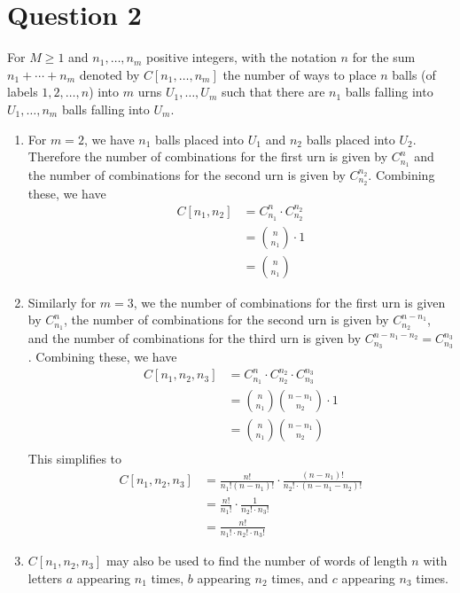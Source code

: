 \documentclass[11pt, oneside]{article}   	%
\begin{document}
\section*{Question 2}

For $M \geq 1$ and $n_1, \ldots , n_m$ positive integers, with the notation $n$ for the sum $n_1 + \cdots + n_m$ denoted by $C[n_1 , \ldots , n_m]$ the number of ways to place $n$ balls (of labels $1,2, \ldots , n$) into $m$ urns $U_1, \ldots , U_m$ such that there are $n_1$ balls falling into $U_1, \ldots , n_m$ balls falling into $U_m$.

\begin{enumerate}[\quad (a)]
	\item For $m=2$, we have $n_1$ balls placed into $U_1$ and $n_2$ balls placed into $U_2$. Therefore the number of combinations for the first urn is given by $C_{n_1}^n$ and the number of combinations for the second urn is given by $C_{n_2}^{n_2}$. Combining these, we have
	\begin{align*}
		C[n_1, n_2] & = C_{n_1}^n \cdot C_{n_2}^{n_2} \\
		& = {n \choose n_1} \cdot 1 \\
		& = {n \choose n_1}
	\end{align*}
	
	\item Similarly for $m=3$, we the number of combinations for the first urn is given by $C_{n_1}^n$, the number of combinations for the second urn is given by $C_{n_2}^{n-n_1}$, and the number of combinations for the third urn is given by $C_{n_3}^{n-n_1-n_2} = C_{n_3}^{n_3}$. Combining these, we have
	\begin{align*}
		C[n_1, n_2, n_3] & = C_{n_1}^n \cdot C_{n_2}^{n_2} \cdot C_{n_3}^{n_3} \\
		& =  {n \choose n_1} {n-n_1 \choose n_2} \cdot 1\\
		& = {n \choose n_1} {n-n_1 \choose n_2}\\
	\end{align*}
	This simplifies to
	\begin{align*}
		C[n_1, n_2, n_3] & = \frac{n!}{n_1! (n-n_1)!} \cdot \frac{(n-n_1)!}{n_2! \cdot (n-n_1-n_2)!} \\
		& = \frac{n!}{n_1!} \cdot \frac{1}{n_2! \cdot n_3!} \\
		& = \frac{n!}{n_1! \cdot n_2! \cdot n_3!}
	\end{align*}
	
	\item $C[n_1, n_2, n_3]$ may also be used to find the number of words of length $n$ with letters $a$ appearing $n_1$ times, $b$ appearing $n_2$ times, and $c$ appearing $n_3$ times.
	

\end{enumerate}
\end{document}
